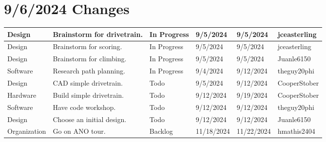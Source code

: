 \section{9/6/2024 Changes}
\begin{center}
\begin{longtable}{| p{40pt} | p{150pt} | p{35pt} | p{33pt} | p{33pt} | p{40pt} |}
\hline \rowcolor{LightGoldenrod1}
Design & Brainstorm for drivetrain. & In Progress & 9/5/2024 & 9/5/2024 & jceasterling \\
\hline \rowcolor{LightGoldenrod1}
Design & Brainstorm for scoring. & In Progress & 9/5/2024 & 9/5/2024 & jceasterling \\
\hline \rowcolor{LightGoldenrod1}
Design & Brainstorm for climbing. & In Progress & 9/5/2024 & 9/5/2024 & Juanle6150 \\
\hline \rowcolor{LightGoldenrod1}
Software & Research path planning. & In Progress & 9/4/2024 & 9/12/2024 & theguy20phi \\
\hline \rowcolor{IndianRed1}
Design & CAD simple drivetrain. & Todo & 9/5/2024 & 9/12/2024 & CooperStober \\
\hline \rowcolor{IndianRed1}
Hardware & Build simple drivetrain. & Todo & 9/12/2024 & 9/19/2024 & CooperStober \\
\hline \rowcolor{IndianRed1}
Software & Have code workshop. & Todo & 9/12/2024 & 9/12/2024 & theguy20phi \\
\hline \rowcolor{IndianRed1}
Design & Choose an initial design. & Todo & 9/12/2024 & 9/12/2024 & Juanle6150 \\
\hline \rowcolor{Ivory2}
Organization & Go on ANO tour. & Backlog & 11/18/2024 & 11/22/2024 & hmathis2404 \\
\hline
\end{longtable}
\end{center}


